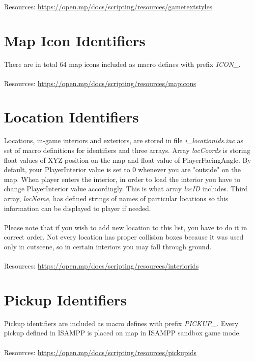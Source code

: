 \documentclass{article}
\begin{document}
\\\\
\\Resources: \url{https://open.mp/docs/scripting/resources/gametextstyles}


\section{Map Icon Identifiers}
There are in total 64 map icons included as macro defines with prefix \textit{ICON\_}.
\\
\\Resources: \url{https://open.mp/docs/scripting/resources/mapicons}


\section{Location Identifiers}
Locations, in-game interiors and exteriors, are stored in file \textit{i\_locationids.inc} as set of macro definitions for identifiers and three arrays. Array \textit{locCoords} is storing float values of XYZ position on the map and float value of PlayerFacingAngle. By default, your PlayerInterior value is set to 0 whenever you are "outside" on the map. When player enters the interior, in order to load the interior you have to change PlayerInterior value accordingly. This is what array \textit{locID} includes. Third array, \textit{locName}, has defined strings of names of particular locations so this information can be displayed to player if needed.\\
\\
Please note that if you wish to add new location to this list, you have to do it in correct order. Not every location has proper collision boxes because it was used only in cutscene, so in certain interiors you may fall through ground.
\\
\\Resources: \url{https://open.mp/docs/scripting/resources/interiorids}


\section{Pickup Identifiers}
Pickup identifiers are included as macro defines with prefix \textit{PICKUP\_}. Every pickup defined in ISAMPP is placed on map in ISAMPP sandbox game mode.
\\
\\Resources: \url{https://open.mp/docs/scripting/resources/pickupids}
\end{document}
